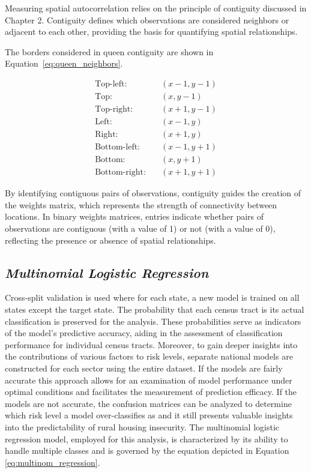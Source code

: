 Measuring spatial autocorrelation relies on the principle of contiguity discussed in Chapter 2. Contiguity defines which observations are considered neighbors or adjacent to each other, providing the basis for quantifying spatial relationships. 

The borders considered in queen contiguity are shown in Equation~\ref{eq:queen_neighbors}.


\begin{equation}
    \label{eq:queen_neighbors}
    \begin{aligned}
        \text{Top-left:} & \quad (x-1, y-1) \\
        \text{Top:} & \quad (x, y-1) \\
        \text{Top-right:} & \quad (x+1, y-1) \\
        \text{Left:} & \quad (x-1, y) \\
        \text{Right:} & \quad (x+1, y) \\
        \text{Bottom-left:} & \quad (x-1, y+1) \\
        \text{Bottom:} & \quad (x, y+1) \\
        \text{Bottom-right:} & \quad (x+1, y+1)
    \end{aligned}
\end{equation}

By identifying contiguous pairs of observations, contiguity guides the creation of the weights matrix, which represents the strength of connectivity between locations. In binary weights matrices, entries indicate whether pairs of observations are contiguous (with a value of 1) or not (with a value of 0), reflecting the presence or absence of spatial relationships. 

\subsection{\textit{Multinomial Logistic Regression}}

Cross-split validation is used where for each state, a new model is trained on all states except the target state. The probability that each census tract is its actual classification is preserved for the analysis. These probabilities serve as indicators of the model's predictive accuracy, aiding in the assessment of classification performance for individual census tracts. Moreover, to gain deeper insights into the contributions of various factors to risk levels, separate national models are constructed for each sector using the entire dataset. If the models are fairly accurate this approach allows for an examination of model performance under optimal conditions and facilitates the measurement of prediction efficacy. If the models are not accurate, the confusion matrices can be analyzed to determine which risk level a model over-classifies as and it still presents valuable insights into the predictability of rural housing insecurity. The multinomial logistic regression model, employed for this analysis, is characterized by its ability to handle multiple classes and is governed by the equation depicted in Equation \ref{eq:multinom_regression}.


